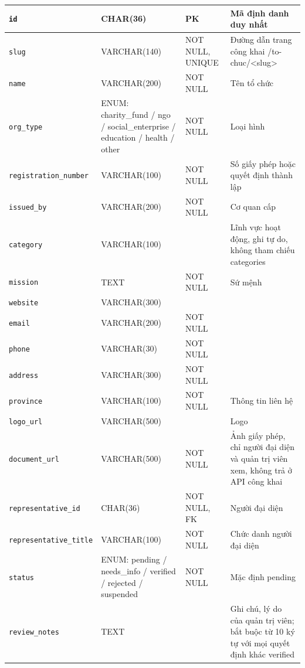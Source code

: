 {\begin{longtable}{|P{3.2cm}|P{2.8cm}|P{2.2cm}|p{5.4cm}|}
    \texttt{id} & CHAR(36) & PK & Mã định danh duy nhất \\
    \hline
    \texttt{slug} & VARCHAR(140) & NOT NULL, UNIQUE & Đường dẫn trang công khai /to-chuc/\textless{}slug\textgreater{} \\
    \hline
    \texttt{name} & VARCHAR(200) & NOT NULL & Tên tổ chức \\
    \hline
    \texttt{org\_\allowbreak{}type} & ENUM: charity\_\allowbreak{}fund / ngo / social\_\allowbreak{}enterprise / education / health / other & NOT NULL & Loại hình \\
    \hline
    \texttt{registration\_\allowbreak{}number} & VARCHAR(100) & NOT NULL & Số giấy phép hoặc quyết định thành lập \\
    \hline
    \texttt{issued\_\allowbreak{}by} & VARCHAR(200) & NOT NULL & Cơ quan cấp \\
    \hline
    \texttt{category} & VARCHAR(100) &  & Lĩnh vực hoạt động, ghi tự do, không tham chiếu categories \\
    \hline
    \texttt{mission} & TEXT & NOT NULL & Sứ mệnh \\
    \hline
    \texttt{website} & VARCHAR(300) &  &  \\
    \hline
    \texttt{email} & VARCHAR(200) & NOT NULL &  \\
    \hline
    \texttt{phone} & VARCHAR(30) & NOT NULL &  \\
    \hline
    \texttt{address} & VARCHAR(300) & NOT NULL &  \\
    \hline
    \texttt{province} & VARCHAR(100) & NOT NULL & Thông tin liên hệ \\
    \hline
    \texttt{logo\_\allowbreak{}url} & VARCHAR(500) &  & Logo \\
    \hline
    \texttt{document\_\allowbreak{}url} & VARCHAR(500) & NOT NULL & Ảnh giấy phép, chỉ người đại diện và quản trị viên xem, không trả ở API công khai \\
    \hline
    \texttt{representative\_\allowbreak{}id} & CHAR(36) & NOT NULL, FK & Người đại diện \\
    \hline
    \texttt{representative\_\allowbreak{}title} & VARCHAR(100) & NOT NULL & Chức danh người đại diện \\
    \hline
    \texttt{status} & ENUM: pending / needs\_\allowbreak{}info / verified / rejected / suspended & NOT NULL & Mặc định pending \\
    \hline
    \texttt{review\_\allowbreak{}notes} & TEXT &  & Ghi chú, lý do của quản trị viên; bắt buộc từ 10 ký tự với mọi quyết định khác verified \\

\end{longtable}}

